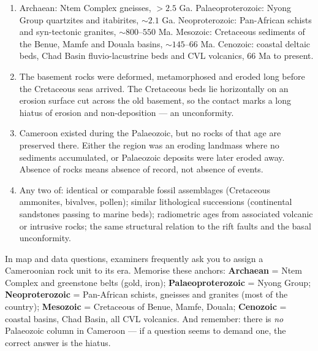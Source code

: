 \documentclass[11pt]{article}
\begin{document}
\begin{corrige}
\begin{enumerate}
\item Archaean: Ntem Complex gneisses, $>2.5$ Ga. Palaeoproterozoic: Nyong Group quartzites and itabirites, $\sim 2.1$ Ga. Neoproterozoic: Pan-African schists and syn-tectonic granites, $\sim 800$--$550$ Ma. Mesozoic: Cretaceous sediments of the Benue, Mamfe and Douala basins, $\sim 145$--$66$ Ma. Cenozoic: coastal deltaic beds, Chad Basin fluvio-lacustrine beds and CVL volcanics, $66$ Ma to present.
\item The basement rocks were deformed, metamorphosed and eroded long before the Cretaceous seas arrived. The Cretaceous beds lie horizontally on an erosion surface cut across the old basement, so the contact marks a long hiatus of erosion and non-deposition --- an unconformity.
\item Cameroon existed during the Palaeozoic, but no rocks of that age are preserved there. Either the region was an eroding landmass where no sediments accumulated, or Palaeozoic deposits were later eroded away. Absence of rocks means absence of record, not absence of events.
\item Any two of: identical or comparable fossil assemblages (Cretaceous ammonites, bivalves, pollen); similar lithological successions (continental sandstones passing to marine beds); radiometric ages from associated volcanic or intrusive rocks; the same structural relation to the rift faults and the basal unconformity.
\end{enumerate}
\end{corrige}

\begin{attention}
In map and data questions, examiners frequently ask you to assign a Cameroonian rock unit to its era. Memorise these anchors: \textbf{Archaean} = Ntem Complex and greenstone belts (gold, iron); \textbf{Palaeoproterozoic} = Nyong Group; \textbf{Neoproterozoic} = Pan-African schists, gneisses and granites (most of the country); \textbf{Mesozoic} = Cretaceous of Benue, Mamfe, Douala; \textbf{Cenozoic} = coastal basins, Chad Basin, all CVL volcanics. And remember: there is \emph{no} Palaeozoic column in Cameroon --- if a question seems to demand one, the correct answer is the hiatus.
\end{attention}
\end{document}
